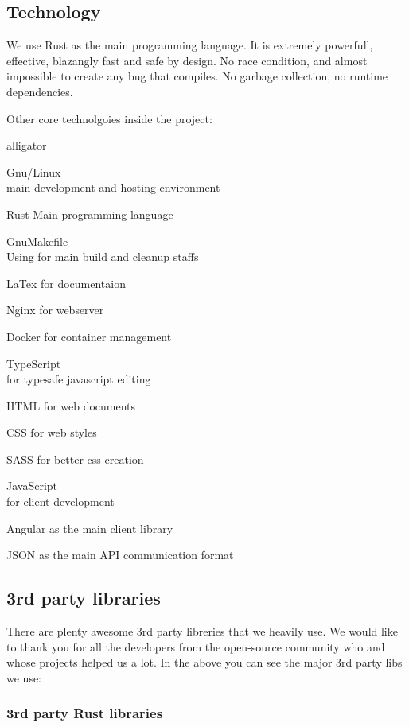 \documentclass{article}
\begin{document}
\subsection{Technology}

We use Rust as the main programming language. It is extremely powerfull,
effective, blazangly fast and safe by design. No race condition, and
almost impossible to create any bug that compiles. No garbage collection,
no runtime dependencies.

Other core technolgoies inside the project:

\begin{labeling}{alligator}
  \item [Gnu/Linux] \hfill \\ main development and hosting environment
  \item [Rust] Main programming language
  \item [GnuMakefile] \hfill \\ Using for main build and cleanup staffs
  \item [LaTex] for documentaion
  \item [Nginx] for webserver
  \item [Docker] for container management
  \item [TypeScript] \hfill \\ for typesafe javascript editing
  \item [HTML] for web documents
  \item [CSS] for web styles
  \item [SASS] for better css creation
  \item [JavaScript] \hfill \\ for client development
  \item [Angular] as the main client library
  \item [JSON] as the main API communication format
\end{labeling}

\subsection{3rd party libraries}

There are plenty awesome 3rd party libreries that we heavily use.
We would like to thank you for all the developers from the open-source
community who and whose projects helped us a lot.
In the above you can see the major 3rd party libs we use:

\subsubsection{3rd party Rust libraries}
\end{document}
